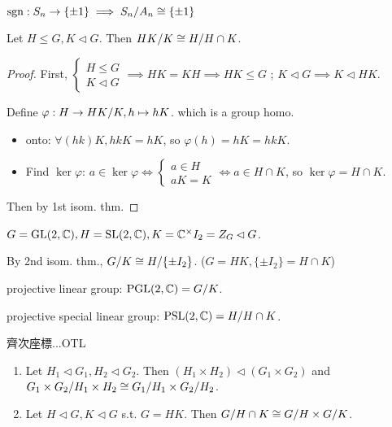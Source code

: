 \begin{example}
  $\operatorname{sgn}: S_n \to \{ \pm 1 \} \implies {S_n}/{A_n} \cong \{ \pm 1 \}$
\end{example}

\begin{theorem}
  Let $H \le G, K \lhd G$. Then ${HK}/{K} \cong {H}/{H\cap K}$.
  \begin{proof}
    First, $\begin{cases}H\le G \\ K \lhd G\end{cases} \implies HK = KH
      \implies HK \le G$ ; $K \lhd G \implies K \lhd HK$.

    Define $\varphi: H \to {HK}/{K}, h \mapsto hK$. which is a group homo.
    \begin{itemize}
      \item onto: $\forall (hk) K, hkK = hK$, so $\varphi(h) = hK = hkK$.
      \item Find $\ker \varphi$: $a \in \ker \varphi \iff \begin{cases}
          a \in H \\
          aK = K
        \end{cases} \iff a \in H \cap K$, so $\ker \varphi = H\cap K$.
    \end{itemize}
    Then by 1st isom. thm.
  \end{proof}
\end{theorem}

\begin{example}
  $G = \text{GL}(2, \mathbb{C}), H = \text{SL}(2, \mathbb{C}), K = \mathbb{C}^\times I_2 = Z_G \lhd G$.

  By 2nd isom. thm., ${G}/{K} \cong {H}/{\{\pm I_2\}}$.
  ($G = HK, \{\pm I_2 \} = H \cap K$)

  projective linear group: $\text{PGL}(2, \mathbb{C}) = {G}/{K}$.

  projective special linear group: $\text{PSL}(2, \mathbb{C}) = {H}/{H\cap K}$.
\end{example}

齊次座標...OTL

\begin{exercise} \mbox{}
  \begin{enumerate}
    \item Let $H_1 \lhd G_1, H_2 \lhd G_2$. Then $(H_1 \times H_2) \lhd
      (G_1 \times G_2)$ and ${G_1\times G_2}/{H_1\times H_2} \cong
      {G_1}/{H_1} \times {G_2}/{H_2}$.
    \item Let $H \lhd G, K \lhd G$ s.t. $G = HK$. Then
      ${G}/{H\cap K} \cong {G}/{H} \times {G}/{K}$.
  \end{enumerate}
\end{exercise}

